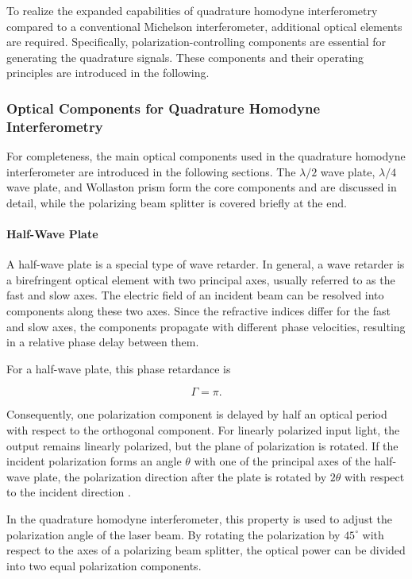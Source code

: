 To realize the expanded capabilities of quadrature homodyne interferometry compared to a conventional Michelson interferometer, additional optical elements are required. Specifically, polarization-controlling components are essential for generating the quadrature signals. These components and their operating principles are introduced in the following.

\subsubsection{Optical Components for Quadrature Homodyne Interferometry}

For completeness, the main optical components used in the quadrature homodyne interferometer are introduced in the following sections. The \(\lambda/2\) wave plate, \(\lambda/4\) wave plate, and Wollaston prism form the core components and are discussed in detail, while the polarizing beam splitter is covered briefly at the end.

\paragraph{Half-Wave Plate}

A half-wave plate is a special type of wave retarder. In general, a wave retarder is a birefringent optical element with two principal axes, usually referred to as the fast and slow axes. The electric field of an incident beam can be resolved into components along these two axes. Since the refractive indices differ for the fast and slow axes, the components propagate with different phase velocities, resulting in a relative phase delay between them. 

For a half-wave plate, this phase retardance is

\begin{equation}
    \Gamma = \pi .
\end{equation}

Consequently, one polarization component is delayed by half an optical period with respect to the orthogonal component. For linearly polarized input light, the output remains linearly polarized, but the plane of polarization is rotated. If the incident polarization forms an angle \(\theta\) with one of the principal axes of the half-wave plate, the polarization direction after the plate is rotated by \(2\theta\) with respect to the incident direction .

In the quadrature homodyne interferometer, this property is used to adjust the polarization angle of the laser beam. By rotating the polarization by \(45^\circ\) with respect to the axes of a polarizing beam splitter, the optical power can be divided into two equal polarization components. 
